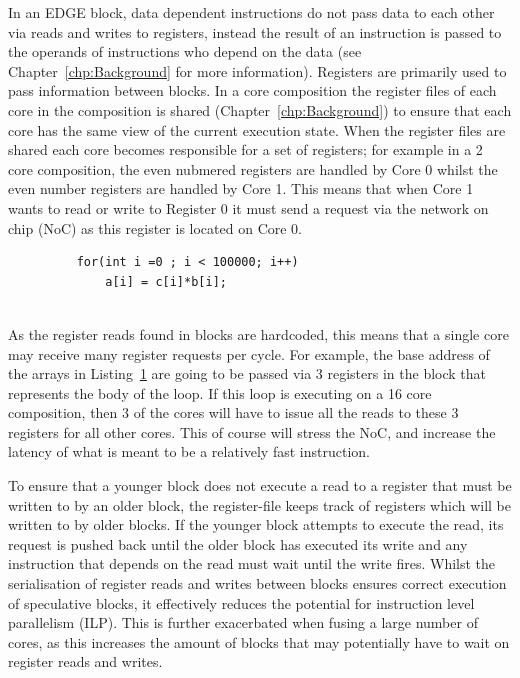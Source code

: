 In an EDGE block, data dependent instructions do not pass data to each other via reads and writes to registers, instead the result of an instruction is passed to the operands of instructions who depend on the data (see Chapter~\ref{chp:Background} for more information).
Registers are primarily used to pass information between blocks.
In a core composition the register files of each core in the composition is shared (Chapter~\ref{chp:Background}) to ensure that each core has the same view of the current execution state.
When the register files are shared each core becomes responsible for a set of registers; for example in a 2 core composition, the even nubmered registers are handled by Core 0 whilst the even number registers are handled by Core 1.
This means that when Core 1 wants to read or write to Register 0 it must send a request via the network on chip (NoC) as this register is located on Core 0.

\begin{figure}[t]
\lstset{language=C,numbersep=4pt}
\begin{center}
\begin{lstlisting}
	for(int i =0 ; i < 100000; i++)
		a[i] = c[i]*b[i];
	
\end{lstlisting}
\end{center}
\vspace{-1em}
\label{lst:basic}
\end{figure}

As the register reads found in blocks are hardcoded, this means that a single core may receive many register requests per cycle.
For example, the base address of the arrays in Listing~\ref{lst:basic} are going to be passed via 3 registers in the block that represents the body of the loop.
If this loop is executing on a 16 core composition, then 3 of the cores will have to issue all the reads to these 3 registers for all other cores.
This of course will stress the NoC, and increase the latency of what is meant to be a relatively fast instruction.

To ensure that a younger block does not execute a read to a register that must be written to by an older block, the register-file keeps track of registers which will be written to by older blocks.
If the younger block attempts to execute the read, its request is pushed back until the older block has executed its write and any instruction that depends on the read must wait until the write fires.
Whilst the serialisation of register reads and writes between blocks ensures correct execution of speculative blocks, it effectively reduces the potential for instruction level parallelism (ILP).
This is further exacerbated when fusing a large number of cores, as this increases the amount of blocks that may potentially have to wait on register reads and writes.

